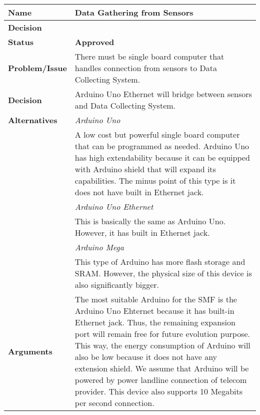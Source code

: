 \begin{table}[H]
	\begin{tabular}{L{0.2\textwidth} L{0.6\textwidth}}
		\textbf{Name}           & \textbf{Data Gathering from Sensors} \\ \toprule
		\textbf{Decision}       & \textbf{}\\ \midrule
		\textbf{Status}         & \textbf{Approved} \\ \midrule
		\textbf{Problem/Issue}  & There must be single board computer that handles connection from sensors to Data Collecting System. \\ \midrule
		\textbf{Decision}       & Arduino Uno Ethernet will bridge between sensors and Data Collecting System.\\ \midrule
		\textbf{Alternatives}   & \textit{Arduino Uno}\\
		& A low cost but powerful single board computer that can be programmed as needed. Arduino Uno has high extendability because it can be equipped with Arduino shield that will expand its capabilities. The minus point of this type is it does not have built in Ethernet jack. \\
		& \textit{Arduino Uno Ethernet}\\
		& This is basically the same as Arduino Uno. However, it has built in Ethernet jack.\\
		& \textit{Arduino Mega}\\
		& This type of Arduino has more flash storage and SRAM. However, the physical size of this device is also significantly bigger.\\
		\midrule
		\textbf{Arguments}      & The most suitable Arduino for the SMF is the Arduino Uno Ehternet because it has built-in Ethernet jack. Thus, the remaining expansion port will remain free for future evolution purpose. This way, the energy consumption of Arduino will also be low because it does not have any extension shield. We assume that Arduino will be powered by power landline connection of telecom provider. This device also supports 10 Megabits per second connection.
						

\end{tabular}
\end{table}
